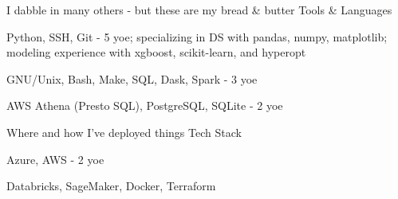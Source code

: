 
\begin{cventries}
  \cventry
    {I dabble in many others - but these are my bread \& butter}
    {Tools \& Languages}
    {}
    {}
    {
      \begin{cvitems}
        \item {Python, SSH, Git - 5 yoe; specializing in DS with pandas, numpy, matplotlib; modeling experience with xgboost, scikit-learn, and hyperopt}
        \item {GNU/Unix, Bash, Make, SQL, Dask, Spark - 3 yoe}
	\item {AWS Athena (Presto SQL), PostgreSQL, SQLite - 2 yoe}
      \end{cvitems}
    }

  \cventry
    {Where and how I've deployed things}
    {Tech Stack}
    {}
    {}
    {
      \begin{cvitems}
        \item {Azure, AWS - 2 yoe}
        \item {Databricks, SageMaker, Docker, Terraform}
      \end{cvitems}
    }

\end{cventries}
